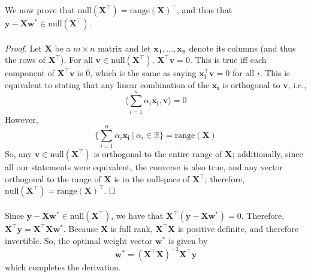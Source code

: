 \documentclass{article}
\begin{document}
We now prove that $\text{null}(\mathbf{X}^{\top}) = \text{range}(\mathbf{X})^{\top}$, and thus that $\mathbf{y - Xw^*} \in \text{null}(\mathbf{X}^{\top})$. \\\\
\textit{Proof.} Let $\mathbf{X}$ be a $m \times n$ matrix and let $\mathbf{x_1, \ldots, x_n}$ denote its columns (and thus the rows of $\mathbf{X^{\top}}$). For all $\mathbf{v} \in \text{null}(\mathbf{X^{\top}})$, $\mathbf{X^{\top}v} = 0$. This is true iff each component of $\mathbf{X^{\top}v}$ is 0, which is the same as saying $\mathbf{x_i^{\top}v} = 0$ for all $i$. This is equivalent to stating that any linear combination of the $\mathbf{x_i}$ is orthogonal to $\mathbf{v}$, i.e., $$\langle \sum\limits_{i=1}^n \alpha_i\mathbf{x_i}, \mathbf{v} \rangle = 0$$ However, $$\{\sum\limits_{i=1}^n \alpha_i\mathbf{x_i}\ |\ \alpha_i \in \mathbb{R}\} = \text{range}(\mathbf{X})$$ So, any $\mathbf{v} \in \text{null}(\mathbf{X^{\top}})$ is orthogonal to the entire range of $\mathbf{X}$; additionally, since all our statements were equivalent, the converse is also true, and any vector orthogonal to the range of $\mathbf{X}$ is in the nullspace of $\mathbf{X^{\top}}$; therefore, 
$\text{null}(\mathbf{X}^{\top}) = \text{range}(\mathbf{X})^{\top}$. $\hfill\square$\\\\
Since $\mathbf{y - Xw^*} \in \text{null}(\mathbf{X}^{\top})$, we have that $\mathbf{X^{\top}(y - Xw^*)} = 0$. Therefore, $\mathbf{X^{\top}y} = \mathbf{X^{\top}Xw^*}$. Because $\mathbf{X}$ is full rank, $\mathbf{X^{\top}X}$ is positive definite, and therefore invertible. So, the optimal weight vector $\mathbf{w^*}$ is given by $$\mathbf{w^*} = \mathbf{(X^{\top}X)^{-1}X^{\top}y}$$ which completes the derivation.
\end{document}
